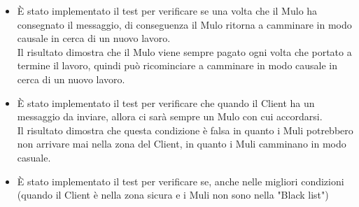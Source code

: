 \documentclass[13pt,a4paper]{article}
\begin{document}
\begin{itemize}
	\item È stato implementato il test per verificare se  una volta che il Mulo ha consegnato il messaggio, di conseguenza il Mulo ritorna a camminare in modo causale in cerca di un nuovo lavoro.\\
	Il risultato dimostra che il Mulo viene sempre pagato ogni volta che portato a termine il lavoro, quindi può ricominciare a camminare in modo causale in cerca di un nuovo lavoro.
	\item È stato implementato il test per verificare che quando il Client ha un messaggio da inviare, allora ci sarà sempre un Mulo con cui accordarsi.\\
	Il risultato dimostra che questa condizione è falsa in quanto i Muli potrebbero non arrivare mai nella zona del Client, in quanto i Muli camminano in modo casuale.
	\item È stato implementato il test per verificare se, anche nelle migliori condizioni (quando il Client è nella zona sicura e i Muli non sono nella "Black list")
	
	

\end{itemize}
	
	
\end{document}
